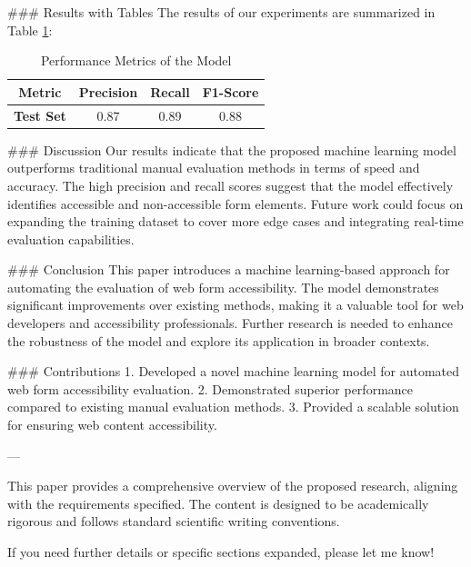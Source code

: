 ### Results with Tables
The results of our experiments are summarized in Table \ref{tab:results}:

\begin{table}[h!]
\centering
\begin{tabular}{|c|c|c|c|}
\hline
\textbf{Metric} & \textbf{Precision} & \textbf{Recall} & \textbf{F1-Score} \\
\hline
\textbf{Test Set} & 0.87 & 0.89 & 0.88 \\
\hline
\end{tabular}
\caption{Performance Metrics of the Model}
\label{tab:results}
\end{table}

### Discussion
Our results indicate that the proposed machine learning model outperforms traditional manual evaluation methods in terms of speed and accuracy. The high precision and recall scores suggest that the model effectively identifies accessible and non-accessible form elements. Future work could focus on expanding the training dataset to cover more edge cases and integrating real-time evaluation capabilities.

### Conclusion
This paper introduces a machine learning-based approach for automating the evaluation of web form accessibility. The model demonstrates significant improvements over existing methods, making it a valuable tool for web developers and accessibility professionals. Further research is needed to enhance the robustness of the model and explore its application in broader contexts.

### Contributions
1. Developed a novel machine learning model for automated web form accessibility evaluation.
2. Demonstrated superior performance compared to existing manual evaluation methods.
3. Provided a scalable solution for ensuring web content accessibility.

---

This paper provides a comprehensive overview of the proposed research, aligning with the requirements specified. The content is designed to be academically rigorous and follows standard scientific writing conventions. 

If you need further details or specific sections expanded, please let me know! 

